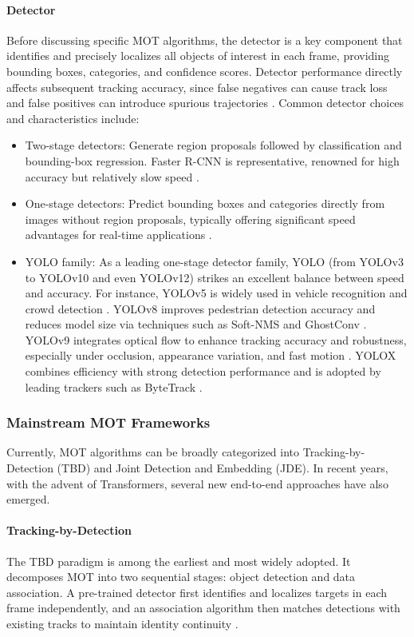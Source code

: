 \paragraph{Detector}
Before discussing specific MOT algorithms, the detector is a key component that identifies and precisely localizes all objects of interest in each frame, providing bounding boxes, categories, and confidence scores. Detector performance directly affects subsequent tracking accuracy, since false negatives can cause track loss and false positives can introduce spurious trajectories \cite{169}. Common detector choices and characteristics include:
\begin{itemize}
    \item Two-stage detectors: Generate region proposals followed by classification and bounding-box regression. Faster R-CNN is representative, renowned for high accuracy but relatively slow speed \cite{88}.
    \item One-stage detectors: Predict bounding boxes and categories directly from images without region proposals, typically offering significant speed advantages for real-time applications \cite{145}.
    \item YOLO family: As a leading one-stage detector family, YOLO (from YOLOv3 to YOLOv10 and even YOLOv12) strikes an excellent balance between speed and accuracy. For instance, YOLOv5 is widely used in vehicle recognition \cite{121} and crowd detection \cite{105}. YOLOv8 improves pedestrian detection accuracy and reduces model size via techniques such as Soft-NMS and GhostConv \cite{190}. YOLOv9 integrates optical flow to enhance tracking accuracy and robustness, especially under occlusion, appearance variation, and fast motion \cite{141}. YOLOX combines efficiency with strong detection performance and is adopted by leading trackers such as ByteTrack \cite{132}.
\end{itemize}

\subsubsection{Mainstream MOT Frameworks}

Currently, MOT algorithms can be broadly categorized into Tracking-by-Detection (TBD) and Joint Detection and Embedding (JDE). In recent years, with the advent of Transformers, several new end-to-end approaches have also emerged.

\paragraph{Tracking-by-Detection}
The TBD paradigm is among the earliest and most widely adopted. It decomposes MOT into two sequential stages: object detection and data association. A pre-trained detector first identifies and localizes targets in each frame independently, and an association algorithm then matches detections with existing tracks to maintain identity continuity \cite{152}.


